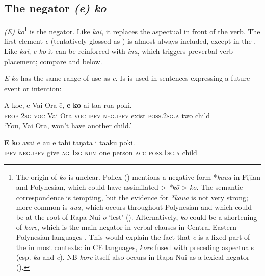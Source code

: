 \subsection{The  negator \textit{(e) ko}}\label{sec:10.5.4}

\textit{(E) ko}\footnote{\label{fn:499}The origin of \textit{ko} is unclear. Pollex (\citealt{GreenhillClark2011}) mentions a negative  form *\textit{kaua} in Fijian and Polynesian, which could have assimilated {\textgreater} \textit{*kō} {\textgreater} \textit{ko}. The semantic correspondence is tempting, but the evidence for \textit{*kaua} is not very strong; more common is \textit{{\ꞌ}aua}, which occurs throughout Polynesian and which could be at the root of Rapa Nui \textit{{\ꞌ}o} ‘lest’ (). Alternatively, \textit{ko} could be a shortening of \textit{kore}, which is the main negator in verbal clauses in Central-Eastern Polynesian languages \citep[100]{Clark1976}. This would explain the fact that \textit{e} is a fixed part of the  in most contexts: in CE languages, \textit{kore} fused with preceding aspectuals (esp. \textit{ka} and \textit{e}). NB \textit{kore} itself also occurs in Rapa Nui as a lexical negator ().} is the  negator. Like \textit{kai}, it replaces the aspectual in front of the verb. The first element \textit{e} (tentatively glossed as ) is almost always included, except in the . Like \textit{kai}, \textit{e ko} it can be reinforced with \textit{{\ꞌ}ina}, which triggers preverbal verb placement; compare  and  below.

\textit{E ko} has the same range of use as  \textit{e}. Is is used in sentences expressing a future event or intention:

\ea\label{ex:10.125}
\gll A koe, e Vai Ora ē, \textbf{e} \textbf{ko} ai ta{\ꞌ}a rua poki. \\
\textsc{prop} \textsc{2sg} \textsc{voc} Vai Ora \textsc{voc} \textsc{ipfv} \textsc{neg.ipfv} exist \textsc{poss.2sg.a} two child \\

\glt 
‘You, Vai Ora, won’t have another child.’ \textstyleExampleref{[R301.077]} 
\z

\ea\label{ex:10.126}
\gll \textbf{E} \textbf{ko} {\ꞌ}avai e au e tahi taŋata i tā{\ꞌ}aku poki. \\
\textsc{ipfv} \textsc{neg.ipfv} give \textsc{ag} \textsc{1sg} \textsc{num} one person \textsc{acc} \textsc{poss.1sg.a} child \\

